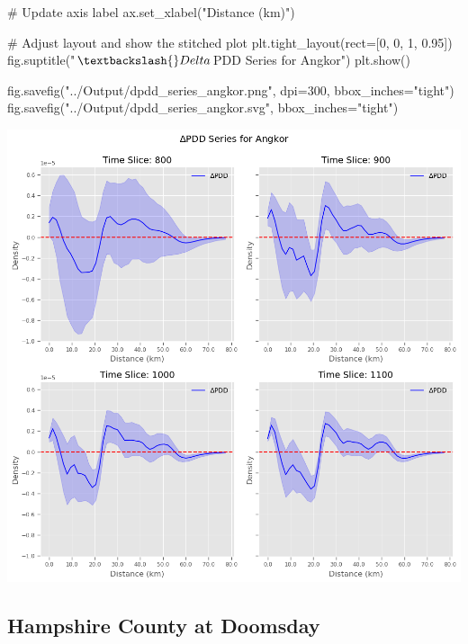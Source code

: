 \documentclass[
  11pt,
  letterpaper,
  DIV=11,
  numbers=noendperiod]{scrartcl}
\newenvironment{Shaded}{\begin{snugshade}}{\end{snugshade}}
\newcommand{\CommentTok}[1]{\textcolor[rgb]{0.37,0.37,0.37}{#1}}
\newcommand{\DecValTok}[1]{\textcolor[rgb]{0.68,0.00,0.00}{#1}}
\newcommand{\FloatTok}[1]{\textcolor[rgb]{0.68,0.00,0.00}{#1}}
\newcommand{\NormalTok}[1]{\textcolor[rgb]{0.00,0.23,0.31}{#1}}
\newcommand{\OperatorTok}[1]{\textcolor[rgb]{0.37,0.37,0.37}{#1}}
\newcommand{\StringTok}[1]{\textcolor[rgb]{0.13,0.47,0.30}{#1}}
\begin{document}
\begin{Shaded}
\begin{Highlighting}[]
    \CommentTok{\# Update axis label}
\NormalTok{    ax.set\_xlabel(}\StringTok{"Distance (km)"}\NormalTok{)}

\CommentTok{\# Adjust layout and show the stitched plot}
\NormalTok{plt.tight\_layout(rect}\OperatorTok{=}\NormalTok{[}\DecValTok{0}\NormalTok{, }\DecValTok{0}\NormalTok{, }\DecValTok{1}\NormalTok{, }\FloatTok{0.95}\NormalTok{])}
\NormalTok{fig.suptitle(}\StringTok{"$\textbackslash{}Delta$PDD Series for Angkor"}\NormalTok{)}
\NormalTok{plt.show()}

\NormalTok{fig.savefig(}\StringTok{"../Output/dpdd\_series\_angkor.png"}\NormalTok{, dpi}\OperatorTok{=}\DecValTok{300}\NormalTok{, bbox\_inches}\OperatorTok{=}\StringTok{"tight"}\NormalTok{)}
\NormalTok{fig.savefig(}\StringTok{"../Output/dpdd\_series\_angkor.svg"}\NormalTok{, bbox\_inches}\OperatorTok{=}\StringTok{"tight"}\NormalTok{)}
\end{Highlighting}
\end{Shaded}

\includegraphics{analysis_files/figure-pdf/cell-17-output-1.png}

\subsection{Hampshire County at
Doomsday}\label{hampshire-county-at-doomsday}
\end{document}
